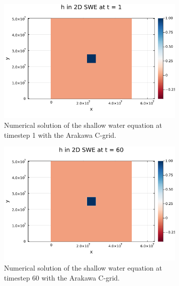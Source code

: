 \begin{figure}[h]
    \centering

    \begin{subfigure}[b]{0.3\textwidth}
        \includegraphics[width=\textwidth]{./images/swe2d-coriolis-1.png}
        \caption{Numerical solution of the shallow water equation at timestep 1 with the Arakawa C-grid.}
        \label{fig:coriolis1}
    \end{subfigure}
    \hfill
    \begin{subfigure}[b]{0.3\textwidth}
        \includegraphics[width=\textwidth]{./images/swe2d-coriolis-60.png}
        \caption{Numerical solution of the shallow water equation at timestep 60 with the Arakawa C-grid.}
        \label{fig:coriolis60}
    \end{subfigure}
    \hfill
    \begin{subfigure}[b]{0.3\textwidth}

\end{subfigure}
\end{figure}

